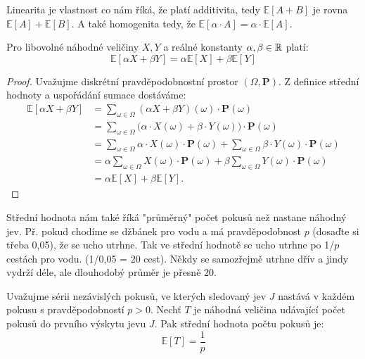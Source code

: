 \bigskip

\noindent Linearita je vlastnost co nám říká, že platí additivita, tedy $\mathbb{E}[A + B]$ je rovna $\mathbb{E}[A] + \mathbb{E}[B]$. A také homogenita tedy, že $\mathbb{E}[\alpha \cdot A] = \alpha \cdot \mathbb{E}[A]$.

\begin{theorem}
Pro libovolné náhodné veličiny $X, Y$ a reálné konstanty $\alpha, \beta \in \mathbb{R}$ platí:
$$\mathbb{E}[\alpha X + \beta Y] = \alpha \mathbb{E}[X] + \beta \mathbb{E}[Y]$$
\end{theorem}

\begin{proof}
Uvažujme diskrétní pravděpodobnostní prostor $(\Omega, \mathbf{P})$.
Z definice střední hodnoty a uspořádání sumace dostáváme:
    \begin{align*}
    \mathbb{E}[\alpha X + \beta Y]
    &= \sum_{\omega \in \Omega} (\alpha X + \beta Y)(\omega) \cdot \mathbf{P}(\omega) \\
    &= \sum_{\omega \in \Omega} \bigl(\alpha \cdot X(\omega) + \beta \cdot Y(\omega)\bigr) \cdot \mathbf{P}(\omega) \\
    &= \sum_{\omega \in \Omega} \alpha \cdot X(\omega) \cdot \mathbf{P}(\omega)
     + \sum_{\omega \in \Omega} \beta \cdot Y(\omega) \cdot \mathbf{P}(\omega) \\
    &= \alpha \sum_{\omega \in \Omega} X(\omega) \cdot \mathbf{P}(\omega)
     + \beta \sum_{\omega \in \Omega} Y(\omega) \cdot \mathbf{P}(\omega) \\
    &= \alpha \mathbb{E}[X] + \beta \mathbb{E}[Y].
    \end{align*}
\end{proof}

\bigskip

\noindent Střední hodnota nám také říká "průměrný" počet pokusů než nastane náhodný jev. Př. pokud chodíme se džbánek pro vodu a má pravděpodobnost $p$ (dosaďte si třeba 0,05), že se ucho utrhne. Tak ve střední hodnotě se ucho utrhne po 1/$p$ cestách pro vodu. (1/0,05 = 20 cest). Někdy se samozřejmě utrhne dřív a jindy vydrží déle, ale dlouhodobý průměr je přesně 20.

\medskip

\begin{theorem}
Uvažujme sérii nezávislých pokusů, ve kterých sledovaný jev $J$ nastává v každém pokusu s pravděpodobností $p > 0$. Nechť $T$ je náhodná veličina udávající počet pokusů do prvního výskytu jevu $J$. Pak střední hodnota počtu pokusů je:
$$\mathbb{E}[T] = \frac{1}{p}$$
\end{theorem}


